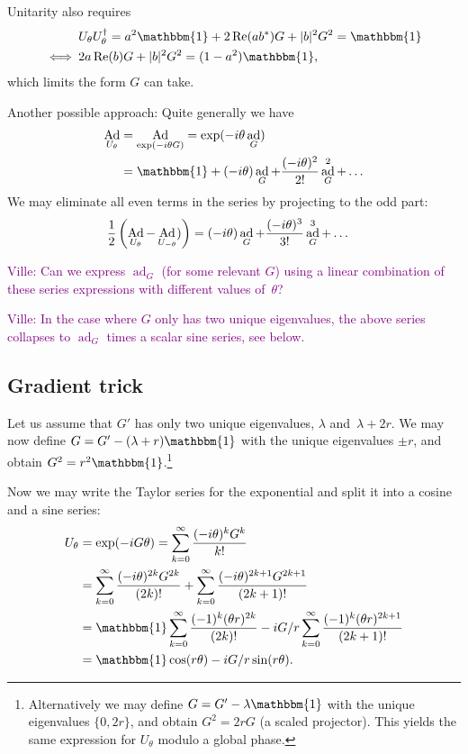 \documentclass[aps,pra,10pt,twocolumn,groupedaddress,nofootinbib]{revtex4-1}
\theoremstyle{plain}
\DeclareMathOperator{\re}{Re}
\DeclareMathOperator{\Ad}{Ad}
\DeclareMathOperator{\ad}{ad}
\newcommand{\I}{\mathbbm{1}} %
\newcommand{\ville}[1]{\textcolor{purple}{Ville: #1}}
\begin{document}
Unitarity also requires
\begin{align}
\notag
&U_\theta U_\theta^\dagger = a^2\I +2\re(ab^*) G +|b|^2 G^2 = \I\\
\iff \:&
2a\re(b) G +|b|^2 G^2 = (1-a^2)\I,
\end{align}
which limits the form $G$ can take.

Another possible approach:
Quite generally we have
\begin{align}
\notag
\Ad_{U_\theta}
&= \Ad_{\exp(-i \theta G)}
= \exp(-i \theta \ad_{G})\\
&= \I +(-i\theta)\ad_G +\frac{(-i\theta)^2}{2!} \ad_G^2 +\ldots
\end{align}
We may eliminate all even terms in the series by projecting to the odd part:
\begin{align}
\notag
\frac{1}{2}\left(\Ad_{U_\theta} -\Ad_{U_{-\theta}})\right)
&= (-i\theta)\ad_G +\frac{(-i\theta)^3}{3!} \ad_G^3 +\ldots
\end{align}


\ville{Can we express $\ad_G$ (for some relevant $G$) using a linear combination of these series expressions with different values of~$\theta$?}

\ville{In the case where $G$ only has two unique eigenvalues, the above series collapses to $\ad_G$ times a scalar sine series, see below.}

\subsection{Gradient trick}
\label{sec:gradient_trick}

Let us assume that $G'$ has only two unique eigenvalues, $\lambda$ and~$\lambda+2r$.
We may now define $G = G' -(\lambda+r)\I$ with the unique eigenvalues
$\pm r$, and obtain $G^2 = r^2\I$.\footnote{
Alternatively we may define $G = G' -\lambda \I$ with the unique eigenvalues
$\{0, 2r\}$, and obtain $G^2 = 2r G$ (a scaled projector).
This yields the same expression for $U_\theta$ modulo a global phase.}


Now we may write the Taylor series for the exponential
and split it into a cosine and a sine series:
\begin{align*}
U_\theta &= \exp(-iG\theta) = \sum_{k=0}^\infty \frac{(-i\theta)^k G^k}{k!}\\
&=
\sum_{k=0}^\infty \frac{(-i\theta)^{2k} G^{2k}}{(2k)!}
+\sum_{k=0}^\infty \frac{(-i\theta)^{2k+1} G^{2k+1}}{(2k+1)!}\\
&=
\I \sum_{k=0}^\infty \frac{(-1)^{k} (\theta r)^{2k}}{(2k)!}
-i G/r \sum_{k=0}^\infty \frac{(-1)^{k} (\theta r)^{2k+1}}{(2k+1)!}\\
&=
\I \cos(r \theta)
-i G/r \sin(r \theta).
\end{align*}
\end{document}

